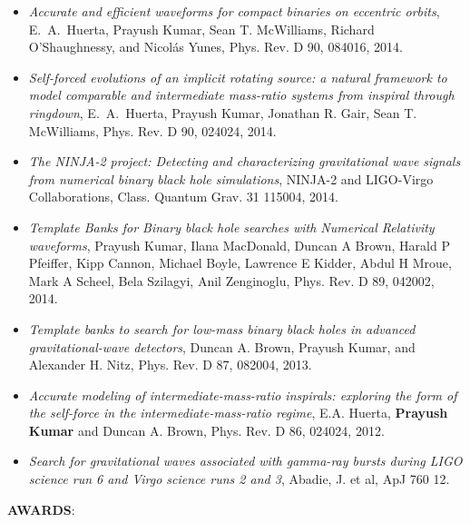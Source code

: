 \begin{itemize}
\item \textit{Accurate and efficient waveforms for compact binaries on eccentric orbits}, E.~A.~Huerta, Prayush Kumar, Sean T. McWilliams, Richard O’Shaughnessy, and Nicol\'{a}s Yunes, Phys. Rev. D 90, 084016, 2014.
\item \textit{Self-forced evolutions of an implicit rotating source: a natural framework to model comparable and intermediate mass-ratio systems from inspiral through ringdown}, E.~A.~Huerta, Prayush Kumar, Jonathan R. Gair, Sean T. McWilliams, Phys. Rev. D 90, 024024, 2014.
\item \textit{The NINJA-2 project: Detecting and characterizing gravitational wave signals from numerical binary black hole simulations}, NINJA-2 and LIGO-Virgo Collaborations, Class. Quantum Grav. 31 115004, 2014.
\item \textit{Template Banks for Binary black hole searches with Numerical Relativity waveforms}, Prayush Kumar, Ilana MacDonald, Duncan A Brown, Harald P Pfeiffer, Kipp Cannon, Michael Boyle, Lawrence E Kidder, Abdul H Mroue, Mark A Scheel, Bela Szilagyi, Anil Zenginoglu, Phys. Rev. D 89, 042002, 2014.
\item \textit{Template banks to search for low-mass binary black holes in advanced gravitational-wave detectors}, Duncan A. Brown, Prayush Kumar, and Alexander H. Nitz, Phys. Rev. D 87, 082004, 2013.
\item \textit{Accurate modeling of intermediate-mass-ratio inspirals: exploring the form of the self-force in the intermediate-mass-ratio regime}, E.A. Huerta, \textbf{Prayush Kumar} and Duncan A. Brown, Phys. Rev. D 86, 024024, 2012.
\item \textit{Search for gravitational waves associated with gamma-ray bursts during LIGO science run 6 and Virgo science runs 2 and 3}, Abadie, J. et al, ApJ 760 12.
\end{itemize}
{\bf AWARDS}:
